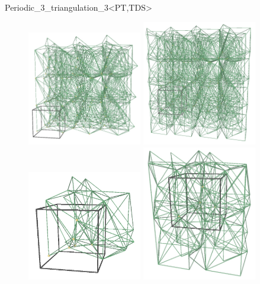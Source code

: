 \begin{ccRefClass}{Periodic_3_triangulation_3<PT,TDS>}
\begin{figure}[htbp]
\begin{ccTexOnly}
\begin{center} 
\includegraphics[width=5cm]{Periodic_3_triangulation_3_ref/it_STORED} 
\includegraphics[width=5cm]{Periodic_3_triangulation_3_ref/it_STORED_COVER_DOMAIN}\\
\includegraphics[width=5cm]{Periodic_3_triangulation_3_ref/it_UNIQUE} 
\includegraphics[width=5cm]{Periodic_3_triangulation_3_ref/it_UNIQUE_COVER_DOMAIN} 

\end{center}
\end{ccTexOnly}
\end{figure}
\end{ccRefClass}
